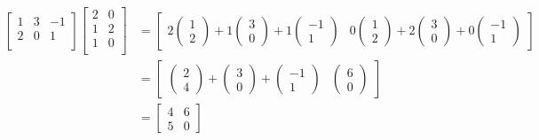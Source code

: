 \documentclass{article}
\begin{document}
\begin{align}
    \begin{bmatrix}
        1 & 3 & -1\\
        2 & 0 & 1\\
    \end{bmatrix}  \begin{bmatrix}
                        2 & 0\\
                        1 & 2\\
                        1 & 0\\
                  \end{bmatrix} &= \begin{bmatrix} 2\begin{pmatrix} 1 \\2 \end{pmatrix} + 1\begin{pmatrix} 3 \\0        \end{pmatrix} + 1\begin{pmatrix} -1 \\1\end{pmatrix} & 0\begin{pmatrix} 1 \\2 \end{pmatrix} + 2\begin{pmatrix} 3 \\0 \end{pmatrix} + 0\begin{pmatrix} -1 \\1 \end{pmatrix} \end{bmatrix} \nonumber \\ &= \begin{bmatrix}\begin{pmatrix} 2 \\4 \end{pmatrix}+\begin{pmatrix} 3 \\0 \end{pmatrix}+\begin{pmatrix} -1 \\1 \end{pmatrix} & \begin{pmatrix} 6 \\0 \end{pmatrix}\end{bmatrix}\nonumber \\
                  &= \begin{bmatrix}
                            4 & 6\\
                            5 & 0
                      \end{bmatrix}\nonumber
\end{align}
\end{document}
